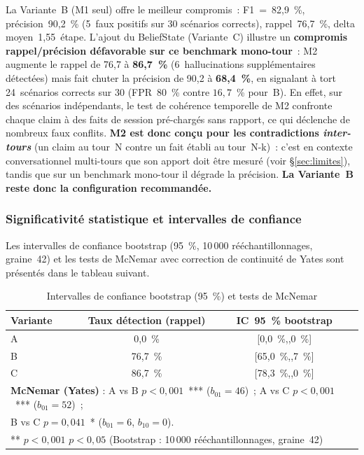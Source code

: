 \documentclass[12pt,a4paper]{article}
\begin{document}
La Variante~B (M1 seul) offre le meilleur compromis~: F1~=~82,9~\%, précision~90,2~\% (5~faux positifs sur 30 scénarios corrects), rappel~76,7~\%, delta moyen~1,55~étape. L'ajout du BeliefState (Variante~C) illustre un \textbf{compromis rappel/précision défavorable sur ce benchmark mono-tour}~: M2 augmente le rappel de 76,7 à \textbf{86,7~\%} (6~hallucinations supplémentaires détectées) mais fait chuter la précision de 90,2 à \textbf{68,4~\%}, en signalant à tort 24~scénarios corrects sur 30 (FPR~$80$~\% contre $16{,}7$~\% pour~B). En effet, sur des scénarios indépendants, le test de cohérence temporelle de M2 confronte chaque claim à des faits de session pré-chargés sans rapport, ce qui déclenche de nombreux faux conflits. \textbf{M2 est donc conçu pour les contradictions \emph{inter-tours}} (un claim au tour~N contre un fait établi au tour~N-k)~: c'est en contexte conversationnel multi-tours que son apport doit être mesuré (voir §\ref{sec:limites}), tandis que sur un benchmark mono-tour il dégrade la précision. \textbf{La Variante~B reste donc la configuration recommandée.}

\subsubsection{Significativité statistique et intervalles de confiance}

Les intervalles de confiance bootstrap (95~\%, 10\,000 rééchantillonnages, graine~42) et les tests de McNemar avec correction de continuité de Yates sont présentés dans le tableau suivant.

\begin{table}[H]
\centering
\caption{Intervalles de confiance bootstrap (95~\%) et tests de McNemar}
\label{tab:stats}
\renewcommand{\arraystretch}{1.25}
\begin{tabular}{lccc}
\toprule
\textbf{Variante} & \textbf{Taux détection (rappel)} & \textbf{IC~95~\% bootstrap} \\
\midrule
A & 0,0~\%  & [0,0~\%,\;0,0~\%]   \\
B & 76,7~\% & [65,0~\%,\;86,7~\%] \\
C & 86,7~\% & [78,3~\%,\;95,0~\%] \\
\midrule
\multicolumn{3}{l}{\textbf{McNemar (Yates)} : A vs B $p<0{,}001$~*** ($b_{01}{=}46$)~; A vs C $p<0{,}001$~*** ($b_{01}{=}52$)~;}\\
\multicolumn{3}{l}{\hspace{1em} B vs C $p=0{,}041$~* ($b_{01}{=}6$, $b_{10}{=}0$).}\\
\bottomrule
\multicolumn{3}{l}{\small *** $p<0{,}001$ \quad * $p<0{,}05$ \quad (Bootstrap : 10\,000 rééchantillonnages, graine~42)}
\end{tabular}
\end{table}
\end{document}
